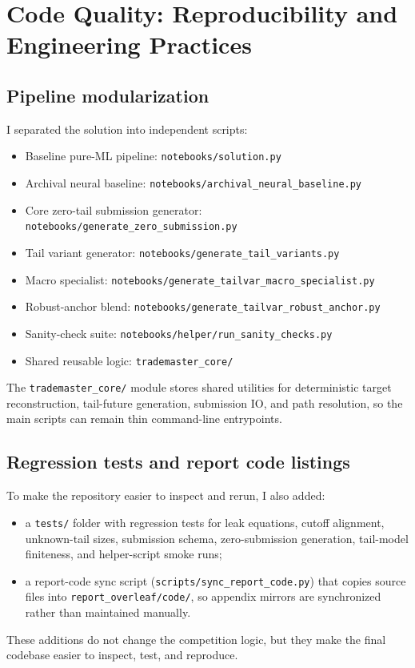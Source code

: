 \section{Code Quality: Reproducibility and Engineering Practices}

\subsection{Pipeline modularization}
I separated the solution into independent scripts:
\begin{itemize}[leftmargin=1.5em]
  \item Baseline pure-ML pipeline: \texttt{notebooks/solution.py}
  \item Archival neural baseline: \texttt{notebooks/archival\_neural\_baseline.py}
  \item Core zero-tail submission generator: \texttt{notebooks/generate\_zero\_submission.py}
  \item Tail variant generator: \texttt{notebooks/generate\_tail\_variants.py}
  \item Macro specialist: \texttt{notebooks/generate\_tailvar\_macro\_specialist.py}
  \item Robust-anchor blend: \texttt{notebooks/generate\_tailvar\_robust\_anchor.py}
  \item Sanity-check suite: \texttt{notebooks/helper/run\_sanity\_checks.py}
  \item Shared reusable logic: \texttt{trademaster\_core/}
\end{itemize}
The \texttt{trademaster\_core/} module stores shared utilities for deterministic target reconstruction, tail-future generation, submission IO, and path resolution, so the main scripts can remain thin command-line entrypoints.

\subsection{Regression tests and report code listings}
To make the repository easier to inspect and rerun, I also added:
\begin{itemize}[leftmargin=1.5em]
  \item a \texttt{tests/} folder with regression tests for leak equations, cutoff alignment, unknown-tail sizes, submission schema, zero-submission generation, tail-model finiteness, and helper-script smoke runs;
  \item a report-code sync script (\texttt{scripts/sync\_report\_code.py}) that copies source files into \texttt{report\_overleaf/code/}, so appendix mirrors are synchronized rather than maintained manually.
\end{itemize}
These additions do not change the competition logic, but they make the final codebase easier to inspect, test, and reproduce.

